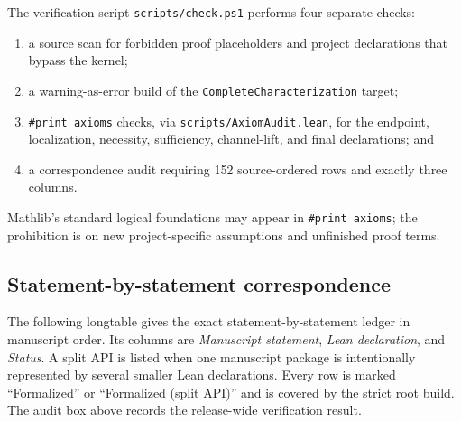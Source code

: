 The verification script \texttt{scripts/check.ps1} performs four separate
checks:
\begin{enumerate}
  \item a source scan for forbidden proof placeholders and project
        declarations that bypass the kernel;
  \item a warning-as-error build of the
        \texttt{CompleteCharacterization} target;
  \item \texttt{\#print axioms} checks, via
        \texttt{scripts/AxiomAudit.lean}, for the endpoint, localization,
        necessity, sufficiency, channel-lift, and final declarations; and
  \item a correspondence audit requiring 152 source-ordered rows and exactly
        three columns.
\end{enumerate}
Mathlib's standard logical foundations may appear in
\texttt{\#print axioms}; the prohibition is on new project-specific
assumptions and unfinished proof terms.

\begin{center}
\end{center}

\subsection{Statement-by-statement correspondence}
\label{app:lean-correspondence}

The following longtable gives the exact statement-by-statement ledger in
manuscript order.  Its columns are
\emph{Manuscript statement}, \emph{Lean declaration}, and \emph{Status}.
A split API is listed when one manuscript package is intentionally represented
by several smaller Lean declarations.  Every row is marked ``Formalized'' or
``Formalized (split API)'' and is covered by the strict root build.  The audit
box above records the release-wide verification result.


